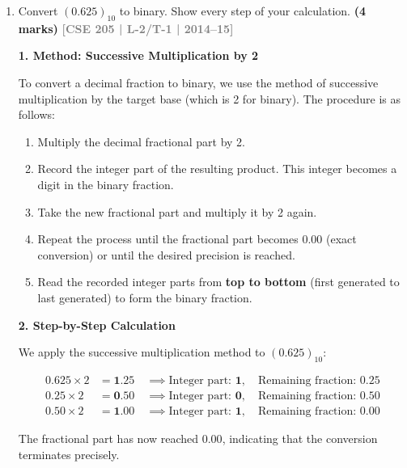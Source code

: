 \documentclass[12pt,a3paper]{article}
\newcommand{\yr}[1]{\hfill\textcolor{gray}{\small\textbf{[#1]}}}
\newcommand{\mk}[1]{\textcolor{orange!70!black}{\small\textbf{(#1 marks)}}}
\begin{document}
\begin{enumerate}
\begin{tcolorbox}[enhanced,breakable,ansbox,colback=cD!4,colframe=cD,boxrule=0.8pt,arc=5pt,title={\textbf{Answer}},fonttitle=\bfseries\color{white},colbacktitle=cD]
\end{tcolorbox}

\item Convert $(0.625)_{10}$ to binary. Show every step of your calculation.
\mk{4} \yr{CSE 205 | L-2/T-1 | 2014--15}

\begin{tcolorbox}[enhanced,breakable,ansbox,colback=cD!4,colframe=cD,boxrule=0.8pt,arc=5pt,title={\textbf{Answer}},fonttitle=\bfseries\color{white},colbacktitle=cD]

\textbf{\textcolor{cD}{1. Method: Successive Multiplication by 2}}

To convert a decimal fraction to binary, we use the method of successive multiplication by the target base (which is 2 for binary). The procedure is as follows:
\begin{enumerate}
    \item Multiply the decimal fractional part by 2.
    \item Record the integer part of the resulting product. This integer becomes a digit in the binary fraction.
    \item Take the new fractional part and multiply it by 2 again.
    \item Repeat the process until the fractional part becomes $0.00$ (exact conversion) or until the desired precision is reached.
    \item Read the recorded integer parts from \textbf{top to bottom} (first generated to last generated) to form the binary fraction.
\end{enumerate}

\vspace{1em}
\textbf{\textcolor{cD}{2. Step-by-Step Calculation}}

We apply the successive multiplication method to $(0.625)_{10}$:

\begin{align*}
    0.625 \times 2 &= \mathbf{1}.25 \quad \implies \text{Integer part: } \mathbf{1}, \quad \text{Remaining fraction: } 0.25 \\
    0.25 \times 2 &= \mathbf{0}.50 \quad \implies \text{Integer part: } \mathbf{0}, \quad \text{Remaining fraction: } 0.50 \\
    0.50 \times 2 &= \mathbf{1}.00 \quad \implies \text{Integer part: } \mathbf{1}, \quad \text{Remaining fraction: } 0.00
\end{align*}

The fractional part has now reached $0.00$, indicating that the conversion terminates precisely. 


\end{tcolorbox}
\end{enumerate}
\end{document}
